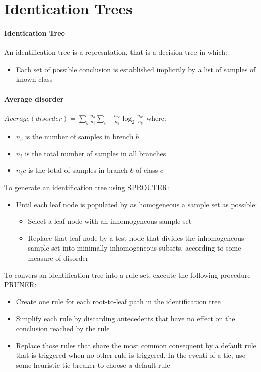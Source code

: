 \documentclass{article}
\begin{document}
\section{Identication Trees}

\paragraph{Identication Tree} An identification tree is a
represntation, that is a decision tree in which:
\begin{itemize}
  \item Each set of possible conclusion is established implicitly
    by a list of samples of known class
\end{itemize}

\paragraph{Average disorder}
\begin{math}
  Average(disorder) =
  \sum_{b}{\frac{n_b}{n_t} \sum_{c}{-\frac{n_{bc}}{n_b}\log_{2}\frac{n_{bc}}{n_b}}}
\end{math}
where:
\begin{itemize}
  \item $n_b$ is the number of samples in brench $b$
  \item $n_t$ is the total number of samples in all branches
  \item $n_bc$ is the total of samples in branch $b$ of class $c$
\end{itemize}

To generate an identification tree using SPROUTER:
\begin{itemize}
  \item Until each leaf node is populated by as homogeneous a
    sample set as possible:
    \begin{itemize}
      \item Select a leaf node with an inhomogeneous sample set
      \item Replace that leaf node by a test node that divides the
        inhomogeneous sample set into minimally inhomogeneous
        subsets, according to some measure of disorder
    \end{itemize}
\end{itemize}

To convers an identification tree into a rule set, execute the
following procedure - PRUNER:
\begin{itemize}
  \item Create one rule for each root-to-leaf path in the
    identification tree
  \item Simplify each rule by discarding antecedents that have no
    effect on the conclusion reached by the rule
  \item Replace those rules that share the most common consequent
    by a default rule that is triggered when no other rule is
    triggered. In the eventi of a tie, use some heuristic tie
    breaker to choose a default rule
\end{itemize}
\end{document}
